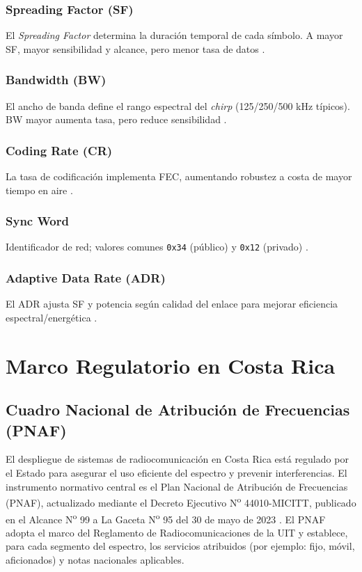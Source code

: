 \documentclass[conference]{IEEEtran}
\begin{document}
\subsubsection{Spreading Factor (SF)}
El \textit{Spreading Factor} determina la duración temporal de cada símbolo. A mayor SF, mayor sensibilidad y alcance, pero menor tasa de datos \cite{lorawan_state_2020}.

\subsubsection{Bandwidth (BW)}
El ancho de banda define el rango espectral del \textit{chirp} (125/250/500 kHz típicos). BW mayor aumenta tasa, pero reduce sensibilidad \cite{lorawan_state_2020}.

\subsubsection{Coding Rate (CR)}
La tasa de codificación implementa FEC, aumentando robustez a costa de mayor tiempo en aire \cite{lorawan_state_2020}.

\subsubsection{Sync Word}
Identificador de red; valores comunes \texttt{0x34} (público) y \texttt{0x12} (privado) \cite{sync_word_2025,semtech_faq_2024}.

\subsubsection{Adaptive Data Rate (ADR)}
El ADR ajusta SF y potencia según calidad del enlace para mejorar eficiencia espectral/energética \cite{adr_collision_2024}.

\section{Marco Regulatorio en Costa Rica}

\subsection{Cuadro Nacional de Atribución de Frecuencias (PNAF)}
El despliegue de sistemas de radiocomunicación en Costa Rica está regulado por el Estado para asegurar el uso eficiente del espectro y prevenir interferencias. El instrumento normativo central es el Plan Nacional de Atribución de Frecuencias (PNAF), actualizado mediante el Decreto Ejecutivo N\textsuperscript{o} 44010-MICITT, publicado en el Alcance N\textsuperscript{o} 99 a La Gaceta N\textsuperscript{o} 95 del 30 de mayo de 2023 \cite{pnaf_2023_micitt}. El PNAF adopta el marco del Reglamento de Radiocomunicaciones de la UIT y establece, para cada segmento del espectro, los servicios atribuidos (por ejemplo: fijo, móvil, aficionados) y notas nacionales aplicables.
\end{document}
